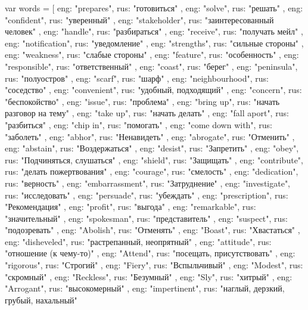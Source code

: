 var words = [
{
    eng: "prepares",
    rus: "готовиться"
}, {
	eng: "solve",
    rus: "решать"
}, {
    eng: "confident",
    rus: "уверенный"
}, {
    eng: "stakeholder",
    rus: "заинтересованный человек"
}, {
    eng: "handle",
    rus: "разбираться"
}, {
    eng: "receive",
    rus: "получать мейл"
}, {
    eng: "notification",
    rus: "уведомление"
}, {
    eng: "strengths",
    rus: "сильные стороны"
}, {
    eng: "weakness",
    rus: "слабые стороны"
}, {
    eng: "feature",
    rus: "особенность"
}, {
    eng: "responsible",
    rus: "ответственный"
}, {
    eng: "coast",
    rus: "берег"
}, {
    eng: "peninsula",
    rus: "полуостров"
}, {
    eng: "scarf",
    rus: "шарф"
}, {
    eng: "neighbourhood",
    rus: "соседство"
}, {
    eng: "convenient",
    rus: "удобный, подходящий"
}, {
    eng: "concern",
    rus: "беспокойство"
}, {
    eng: "issue",
    rus: "проблема"
}, {
    eng: "bring up",
    rus: "начать разговор на тему"
}, {
    eng: "take up",
    rus: "начать делать"
}, {
    eng: "fall aport",
    rus: "разбиться"
}, {
    eng: "chip in",
    rus: "помогать"
}, {
    eng: "come down with",
    rus: "заболеть"
}, {
    eng: "abhor",
    rus: "Ненавидеть"
}, {
    eng: "abrogate",
    rus: "Отменить"
}, {
    eng: "abstain",
    rus: "Воздержаться"
}, {
    eng: "desist",
    rus: "Запретить"
}, {
    eng: "obey",
    rus: "Подчиняться, слушаться"
}, {
    eng: "shield",
    rus: "Защищать"
}, {
    eng: "contribute",
    rus: "делать пожертвования"
}, {
    eng: "courage",
    rus: "смелость"
}, {
    eng: "dedication",
    rus: "верность"
}, {
    eng: "embarrassment",
    rus: "Затруднение"
}, {
    eng: "investigate",
    rus: "исследовать"
}, {
    eng: "persuade",
    rus: "убеждать"
}, {
    eng: "prescription",
    rus: "Рекомендация"
}, {
    eng: "profit",
    rus: "выгода"
}, {
    eng: "remarkable",
    rus: "значительный"
}, {
    eng: "spokesman",
    rus: "представитель"
}, {
    eng: "suspect",
    rus: "подозревать"
}, {
    eng: "Abolish",
    rus: "Отменять"
}, {
    eng: "Boast",
    rus: "Хвастаться"
}, {
    eng: "disheveled",
    rus: "растрепанный, неопрятный"
}, {
    eng: "attitude",
    rus: "отношение (к чему-то)"
}, {
    eng: "Attend",
    rus: "посещать, присутствовать"
}, {
    eng: "rigorous",
    rus: "Строгий"
}, {
    eng: "Fiery",
    rus: "Вспыльчивый"
}, {
    eng: "Modest",
    rus: "скромный"
}, {
    eng: "Reckless",
    rus: "Безумный"
}, {
    eng: "Sly",
    rus: "хитрый"
}, {
    eng: "Arrogant",
    rus: "высокомерный"
}, {
    eng: "impertinent",
    rus: "наглый, дерзкий, грубый, нахальный"
}
